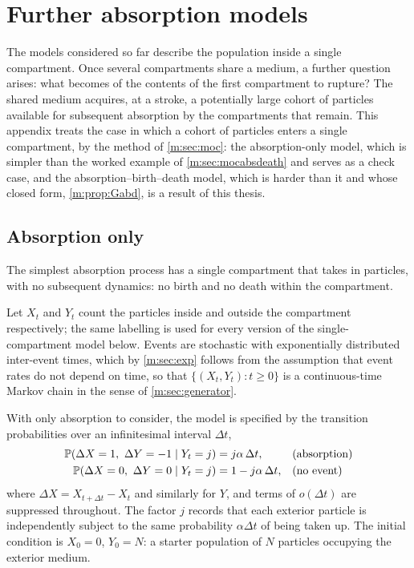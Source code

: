 \section{Further absorption models}
\label{m:app:moc}

The models considered so far describe the population inside a single compartment.
Once several compartments share a medium, a further question arises: what becomes
of the contents of the first compartment to rupture? The shared medium acquires,
at a stroke, a potentially large cohort of particles available for subsequent
absorption by the compartments that remain. This appendix treats the case in
which a cohort of particles enters a single compartment, by the method of
\cref{m:sec:moc}: the absorption-only model, which is simpler than the
worked example of \cref{m:sec:mocabsdeath} and serves as a check case, and the
absorption--birth--death model, which is harder than it and whose closed form,
\cref{m:prop:Gabd}, is a result of this thesis.

\subsection{Absorption only}
\label{m:sec:absonly}

The simplest absorption process has a single compartment that takes in
particles, with no subsequent dynamics: no birth and no death within the
compartment.

Let $X_t$ and $Y_t$ count the particles inside and outside the compartment
respectively; the same labelling is used for every version of the
single-compartment model below. Events are stochastic with exponentially
distributed inter-event times, which by \cref{m:sec:exp} follows from the
assumption that event rates do not depend on time, so that
$\{(X_t,Y_t):t\ge0\}$ is a continuous-time Markov chain in the sense of
\cref{m:sec:generator}.

With only absorption to consider, the model is specified by the transition
probabilities over an infinitesimal interval $\Delta t$,
\begin{align*}
\mathbb{P}\!\left(\Delta X = 1,\ \Delta Y = -1 \mid Y_t = j\right) &= j\alpha\,\Delta t, &&\text{(absorption)}\\
\mathbb{P}\!\left(\Delta X = 0,\ \Delta Y = 0 \mid Y_t = j\right) &= 1-j\alpha\,\Delta t, &&\text{(no event)}
\end{align*}
where $\Delta X = X_{t+\Delta t}-X_t$ and similarly for $Y$, and terms of
$o(\Delta t)$ are suppressed throughout. The factor $j$ records that each
exterior particle is independently subject to the same probability
$\alpha\Delta t$ of being taken up. The initial condition is $X_0=0$, $Y_0=N$:
a starter population of $N$ particles occupying the exterior medium.

